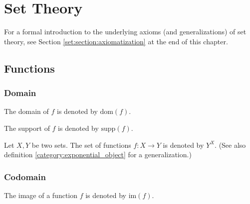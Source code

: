 \chapter{Set Theory}

    For a formal introduction to the underlying axioms (and generalizations) of set theory, see Section \ref{set:section:axiomatization} at the end of this chapter.

\section{Functions}
\subsection{Domain}

    \begin{notation}
        The domain of $f$ is denoted by $\text{dom}(f)$.
    \end{notation}

    \begin{notation}
        The support of $f$ is denoted by $\text{supp}(f)$.
    \end{notation}

    \begin{notation}\label{set:function_set}
        Let $X, Y$ be two sets. The set of functions $f:X\rightarrow Y$ is denoted by $Y^X$. (See also definition \ref{category:exponential_object} for a generalization.)
    \end{notation}

\subsection{Codomain}

    \begin{notation}
        The image of a function $f$ is denoted by $\text{im}(f)$.
    \end{notation}

